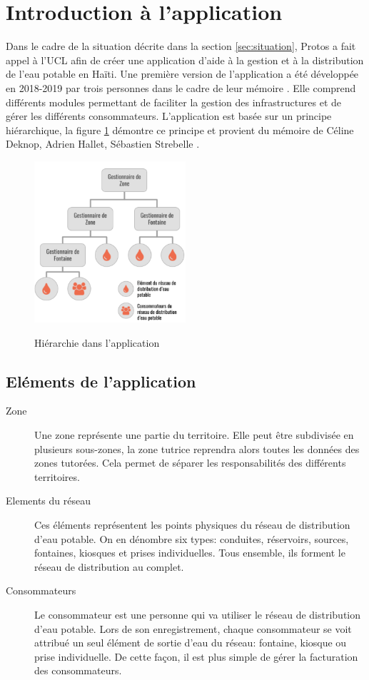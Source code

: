 \documentclass{EPL-master-thesis-covers-FR}
\begin{document}
		\section{Introduction à l'application}
				Dans le cadre de la situation décrite dans la section \ref{sec:situation}, Protos a fait appel à l'UCL afin de créer une application d'aide à la gestion et à la distribution de l'eau potable en Haïti. Une première version de l'application a été développée en 2018-2019 par trois personnes dans le cadre de leur mémoire \cite{ref:haitiwater}. Elle comprend différents modules permettant de faciliter la gestion des infrastructures et de gérer les différents consommateurs. L'application est basée sur un principe hiérarchique, la figure \ref{fig:hierarchie} démontre ce principe et provient du mémoire de Céline Deknop, Adrien Hallet, Sébastien Strebelle \cite{ref:haitiwater}.
				
				\begin{figure}[H]
					\centering
					\includegraphics[width=0.5\textwidth]{images/hierarchie}
					\label{fig:hierarchie}
					\caption{Hiérarchie dans l'application \cite{ref:haitiwater}}
				\end{figure}
				
				
			\subsection{Eléments de l'application}
				\begin{description}
					\item[Zone] Une zone représente une partie du territoire. Elle peut être subdivisée en plusieurs sous-zones, la zone tutrice reprendra alors toutes les données des zones tutorées. Cela permet de séparer les responsabilités des différents territoires.
					\item[Elements du réseau] Ces éléments représentent les points physiques du réseau de distribution d'eau potable. On en dénombre six types: conduites, réservoirs, sources, fontaines, kiosques et prises individuelles. Tous ensemble, ils forment le réseau de distribution au complet. 
					\item[Consommateurs] Le consommateur est une personne qui va utiliser le réseau de distribution d'eau potable. Lors de son enregistrement, chaque consommateur se voit attribué un seul élément de sortie d'eau du réseau: fontaine, kiosque ou prise individuelle. De cette façon, il est plus simple de gérer la facturation des consommateurs.
				\end{description}
				
\end{document}
